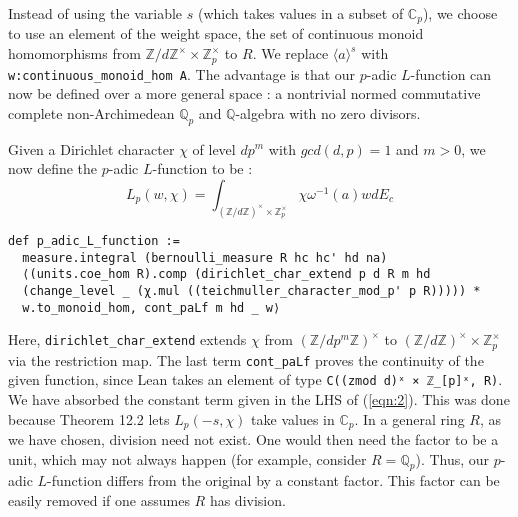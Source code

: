 \documentclass[a4paper,UKenglish,cleveref, autoref, thm-restate]{lipics-v2021}
\newcommand{\lean}[1]{\texttt{#1}\xspace} %
\begin{document}
Instead of using the variable $s$ (which takes values in a subset of $\mathbb{C}_p$), we choose to use an element of the weight space, 
the set of continuous monoid homomorphisms from $\mathbb{Z}/d\mathbb{Z}^{\times} \times \mathbb{Z}_p^{\times}$ to $R$. We replace
$\langle a \rangle ^s$ with \lean{w:continuous\_monoid\_hom A}. The advantage is that our $p$-adic $L$-function can now be defined over a more general space : 
a nontrivial normed commutative complete non-Archimedean $\mathbb{Q}_p$ and $\mathbb{Q}$-algebra with no zero divisors. 

Given a Dirichlet character $\chi$ of level $dp^m$ with $gcd(d, p) = 1$ and $m > 0$,
we now define the $p$-adic $L$-function to be : %
$$ L_p(w, \chi) = \int_{(\mathbb{Z}/d \mathbb{Z})^{\times} \times \mathbb{Z}_p^{\times}}
\chi \omega^{-1}(a) w dE_c $$
\begin{lstlisting}
def p_adic_L_function := 
  measure.integral (bernoulli_measure R hc hc' hd na)
  ⟨(units.coe_hom R).comp (dirichlet_char_extend p d R m hd 
  (change_level _ (χ.mul ((teichmuller_character_mod_p' p R))))) * 
  w.to_monoid_hom, cont_paLf m hd _ w⟩
\end{lstlisting}
Here, \lean{dirichlet\_char\_extend} extends $\chi$ from $(\mathbb{Z}/ dp^m \mathbb{Z})^{\times}$ to 
$(\mathbb{Z}/ d \mathbb{Z})^{\times} \times \mathbb{Z}_p^{\times}$ via the restriction map. The last term 
\lean{cont\_paLf} proves the continuity of the given function, since Lean takes an element of type \lean{C((zmod d)ˣ × ℤ\_[p]ˣ, R)}. 
We have absorbed the constant term given in the LHS of (\ref{eqn:2}). This was done because Theorem 12.2 
lets $L_p(-s, \chi)$ take values in $\mathbb{C}_p$. 
In a general ring $R$, as we have chosen, division need not exist. One would then need the factor to be a unit, which may not always happen 
(for example, consider $R = \mathbb{Q}_p$). Thus, our $p$-adic $L$-function differs from the original by a constant factor. 
This factor can be easily removed if one assumes $R$ has division. 

\end{document}
